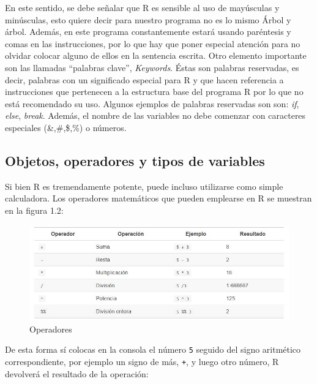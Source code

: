 \documentclass[
  11pt,
  oneside]{book}
\begin{document}
En este sentido, se debe señalar que R es sensible al uso de mayúsculas y minúsculas, esto quiere decir para nuestro programa no es lo mismo Árbol y árbol. Además, en este programa constantemente estará usando paréntesis y comas en las instrucciones, por lo que hay que poner especial atención para no olvidar colocar alguno de ellos en la sentencia escrita. Otro elemento importante son las llamadas ``palabras clave'', \emph{Keywords}. Éstas son palabras reservadas, es decir, palabras con un significado especial para R y que hacen referencia a instrucciones que pertenecen a la estructura base del programa R por lo que no está recomendado su uso. Algunos ejemplos de palabras reservadas son son: \emph{if}, \emph{else}, \emph{break}. Además, el nombre de las variables no debe comenzar con caracteres especiales (\&,\#,\$,\%) o números.

\hypertarget{objetos-operadores-y-tipos-de-variables}{%
\subsection{Objetos, operadores y tipos de variables}\label{objetos-operadores-y-tipos-de-variables}}

Si bien R es tremendamente potente, puede incluso utilizarse como simple calculadora. Los operadores matemáticos que pueden emplearse en R se muestran en la figura 1.2:

\begin{figure}

{\centering \includegraphics[width=1.2\linewidth]{recursos intro/Figura_2-Operadores} 

}

\caption{Operadores}\label{fig:unnamed-chunk-3}
\end{figure}

De esta forma sí colocas en la consola el número \texttt{5} seguido del signo aritmético correspondiente, por ejemplo un signo de más, \texttt{+}, y luego otro número, R devolverá el resultado de la operación:
\end{document}
